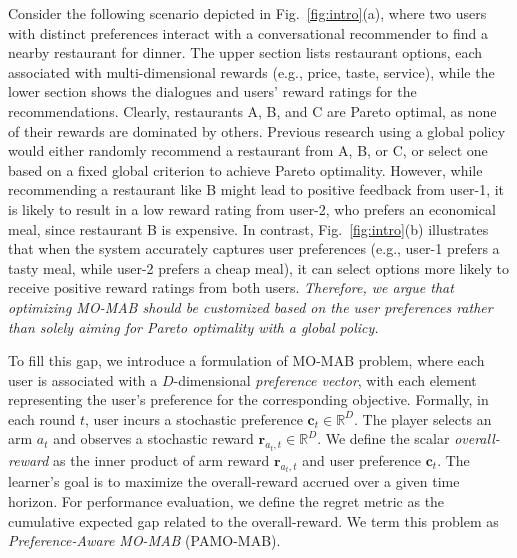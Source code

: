 Consider the following scenario depicted in Fig.~\ref{fig:intro}(a), where two users with distinct preferences interact with a conversational recommender to find a nearby restaurant for dinner. The upper section lists restaurant options, each associated with multi-dimensional rewards (e.g., price, taste, service), while the lower section shows the dialogues and users' reward ratings for the recommendations.
Clearly, restaurants A, B, and C are Pareto optimal, as none of their rewards are dominated by others. 
Previous research using a global policy would either randomly recommend a restaurant from A, B, or C, or select one based on a fixed global criterion to achieve Pareto optimality. 
However, while recommending a restaurant like B might lead to positive feedback from user-1, it is likely to result in a low reward rating from user-2, who prefers an economical meal, since restaurant B is expensive.
In contrast, Fig.~\ref{fig:intro}(b) illustrates that when the system accurately captures user preferences (e.g., user-1 prefers a tasty meal, while user-2 prefers a cheap meal), it can select options more likely to receive positive reward ratings from both users.
\emph{Therefore, we argue that optimizing MO-MAB should be customized based on the user preferences rather than solely aiming for Pareto optimality with a global policy.}


To fill this gap, we introduce a formulation of MO-MAB problem, where each user is associated with a $D$-dimensional \emph{preference vector}, with each element representing the user's preference for the corresponding objective. 
Formally, in each round $t$, user incurs a stochastic preference $\boldsymbol{c}_t \!\in\! \mathbb{R}^D$.
The player selects an arm $a_t$ and observes a stochastic reward $\boldsymbol{r}_{a_t,t} \!\in\! \mathbb{R}^D$.
We define the scalar \emph{overall-reward} as the inner product of arm reward $\boldsymbol{r}_{a_t,t}$ and user preference $\boldsymbol{c}_t$. The learner's goal is to maximize the overall-reward accrued over a given time horizon.
For performance evaluation, we define the regret metric as the cumulative expected gap related to the overall-reward. 
We term this problem as \emph{Preference-Aware MO-MAB} (PAMO-MAB).



